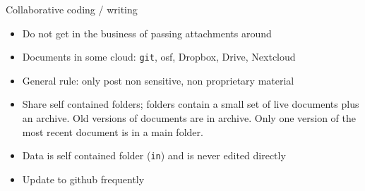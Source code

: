 \documentclass[
  11pt,
  ignorenonframetext,
]{beamer}
\providecommand{\tightlist}{%
  \setlength{\itemsep}{0pt}\setlength{\parskip}{0pt}}\usepackage{longtable,booktabs,array}
\begin{document}
\begin{frame}[fragile]{Collaborative coding / writing}
\protect\hypertarget{collaborative-coding-writing}{}
\begin{itemize}
\tightlist
\item
  Do not get in the business of passing attachments around
\item
  Documents in some cloud: \texttt{git}, osf, Dropbox, Drive, Nextcloud
\item
  General rule: only post non sensitive, non proprietary material
\item
  Share self contained folders; folders contain a small set of live
  documents plus an archive. Old versions of documents are in archive.
  Only one version of the most recent document is in a main folder.
\item
  Data is self contained folder (\texttt{in}) and is never edited
  directly
\item
  Update to github frequently
\end{itemize}
\end{frame}
\end{document}
